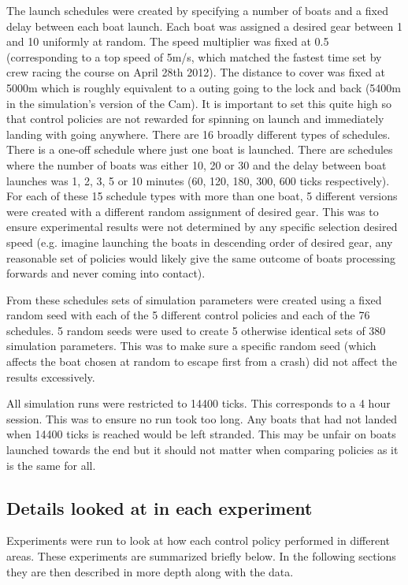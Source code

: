  The launch schedules were created by specifying a number of boats
  and a fixed delay between each boat launch. Each boat was assigned a
  desired gear between 1 and 10 uniformly at random. The speed
  multiplier was fixed at 0.5 (corresponding to a top speed of 5m/s,
  which matched the fastest time set by crew racing the course on
  April 28th 2012). The distance to cover was fixed at 5000m which is
  roughly equivalent to a outing going to the lock and back (5400m in
  the simulation's version of the Cam). It is important to set this
  quite high so that control policies are not rewarded for spinning on
  launch and immediately landing with going anywhere. There are 16 broadly different types of schedules. There is a one-off schedule where just one boat is launched. There are schedules where the number of boats was either 10, 20 or 30 and the delay between boat launches was 1, 2, 3, 5 or 10 minutes (60, 120, 180, 300, 600 ticks respectively).  For each of these 15 schedule types with more than one boat, 5 different versions were created with a different random assignment of desired gear. This was to ensure experimental results were not determined by any specific selection desired speed (e.g. imagine launching the boats in descending order of desired gear, any reasonable set of policies would likely give the same outcome of boats processing forwards and never coming into contact).
  
  From these schedules sets of simulation parameters were created
  using a fixed random seed with each of the 5 different control
  policies and each of the 76 schedules. 5 random seeds were used to
  create 5 otherwise identical sets of 380 simulation parameters. This
  was to make sure a specific random seed (which affects the boat
  chosen at random to escape first from a crash) did not affect the
  results excessively.

  All simulation runs were restricted to 14400 ticks. This corresponds
  to a 4 hour session. This was to ensure no run took too long. Any
  boats that had not landed when 14400 ticks is reached would be left
  stranded. This may be unfair on boats launched towards the end but
  it should not matter when comparing policies as it is the same for all.
  
  \subsection{Details looked at in each experiment}
  Experiments were run to look at how each control policy performed in
  different areas. These experiments are summarized briefly below. In
  the following sections they are then described in more depth along
  with the data.

